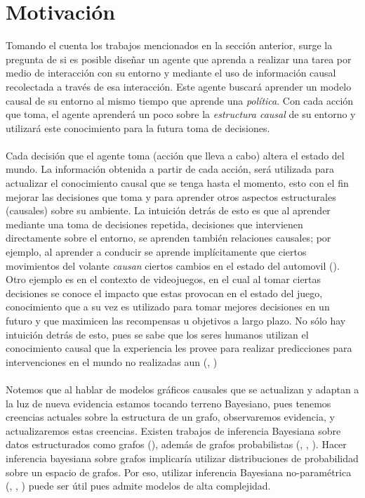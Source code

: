 \documentclass[11pt]{article}
\theoremstyle{plain}
\begin{document}
\section{Motivación}
Tomando el cuenta los trabajos mencionados en la sección anterior, surge la pregunta de si es posible diseñar un agente que aprenda a realizar una tarea por medio de interacción con su entorno y mediante el uso de información causal recolectada a través de esa interacción. Este agente buscará aprender un modelo causal de su entorno al mismo tiempo que aprende una \textit{política}. Con cada acción que toma, el agente aprenderá  un poco sobre la \textit{estructura causal} de su entorno y utilizará este conocimiento para la futura toma de decisiones.\\
\\
Cada decisión que el agente toma (acción que lleva a cabo) altera el estado del mundo. La información obtenida a partir de cada acción, será utilizada para actualizar el conocimiento causal que se tenga hasta el momento, esto con el fin mejorar las decisiones que toma y para aprender otros aspectos estructurales (causales) sobre su ambiente. La intuición detrás de esto es que al aprender mediante una toma de decisiones repetida, decisiones que intervienen directamente sobre el entorno, se aprenden también relaciones causales; por ejemplo, al aprender a conducir se aprende implícitamente que ciertos movimientos del volante \textit{causan} ciertos cambios en el estado del automovil (\cite{danks2014unifying}). Otro ejemplo es en el contexto de videojuegos, en el cual al tomar ciertas decisiones se conoce el impacto que estas provocan en el estado del juego, conocimiento que a su vez es utilizado para tomar mejores decisiones en un futuro y que maximicen las recompensas u objetivos a largo plazo. No sólo hay intuición detrás de esto, pues se sabe que los seres humanos utilizan el conocimiento causal que la experiencia les provee para realizar predicciones para intervenciones en el mundo no realizadas aun (\cite{meder2008inferring}, \cite{hagmayer2009decision})\\
\\
Notemos que al hablar de modelos gráficos causales que se actualizan y adaptan a la luz de nueva evidencia estamos tocando terreno Bayesiano, pues tenemos creencias actuales sobre la estructura de un grafo, observaremos evidencia, y actualizaremos estas creencias. Existen trabajos de inferencia Bayesiana sobre datos estructurados como grafos (\cite{acar2007adaptive}), además de grafos probabilistas (\cite{pearl1988probabilistic}, \cite{koller2009probabilistic}, \cite{sucar2015probabilistic} ). Hacer inferencia bayesiana sobre grafos implicaría utilizar distribuciones de probabilidad sobre un espacio de grafos. Por eso, utilizar inferencia Bayesiana no-paramétrica (\cite{phadia2015prior}, \cite{muller2016bayesian}, \cite{ghosal2017fundamentals}) puede ser útil pues admite modelos de alta complejidad.\\
\end{document}
